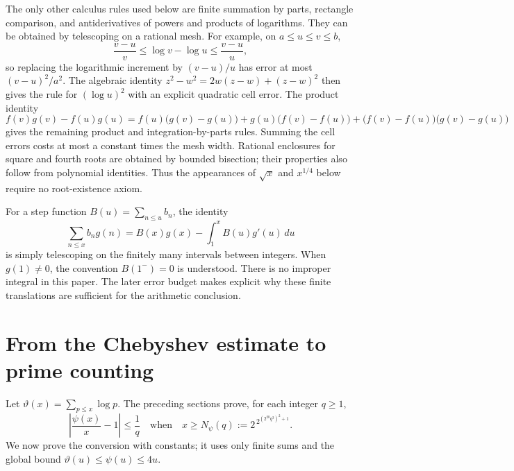 \documentclass[11pt]{article}
\theoremstyle{definition}
\theoremstyle{remark}
\newcommand{\abs}[1]{\left|#1\right|}
\begin{document}
The only other calculus rules used below are finite summation by parts,
rectangle comparison, and antiderivatives of powers and products of
logarithms. They can be obtained by telescoping on a rational mesh.
For example, on $a\le u\le v\le b$,
\[
 \frac{v-u}{v}\le\log v-\log u\le\frac{v-u}{u},
\]
so replacing the logarithmic increment by $(v-u)/u$ has error at most
$(v-u)^2/a^2$. The algebraic identity
$z^2-w^2=2w(z-w)+(z-w)^2$ then gives the rule for $(\log u)^2$ with an
explicit quadratic cell error. The product identity
\[
 f(v)g(v)-f(u)g(u)
 = f(u)\bigl(g(v)-g(u)\bigr)
  +g(u)\bigl(f(v)-f(u)\bigr)
  +\bigl(f(v)-f(u)\bigr)\bigl(g(v)-g(u)\bigr)
\]
gives the remaining product and integration-by-parts rules. Summing the cell
errors costs at most a constant times the mesh width. Rational enclosures
for square and fourth roots are obtained by bounded bisection; their
properties also follow from polynomial identities. Thus the appearances of
$\sqrt{x}$ and $x^{1/4}$ below require no root-existence axiom.

For a step function $B(u)=\sum_{n\le u}b_n$, the identity
\begin{equation}\label{eq:abel}
 \sum_{n\le x}b_n g(n)
 =B(x)g(x)-\int_1^x B(u)g'(u)\,du
\end{equation}
is simply telescoping on the finitely many intervals between integers.
When $g(1)\ne0$, the convention $B(1^-)=0$ is understood. There is no
improper integral in this paper. The later error budget makes explicit why
these finite translations are sufficient for the arithmetic conclusion.




\section{From the Chebyshev estimate to prime counting}\label{sec:pi}

Let $\vartheta(x)=\sum_{p\le x}\log p$. The preceding sections prove, for
each integer $q\ge1$,
\begin{equation}\label{eq:psi-modulus}
 \abs{\frac{\psi(x)}x-1}\le\frac1q
 \quad\text{when}\quad
 x\ge N_\psi(q):=2^{\,2^{(2^{20}q^3)^2+1}}.
\end{equation}
We now prove the conversion with constants; it uses only finite sums and
the global bound $\vartheta(u)\le\psi(u)\le4u$.
\end{document}
